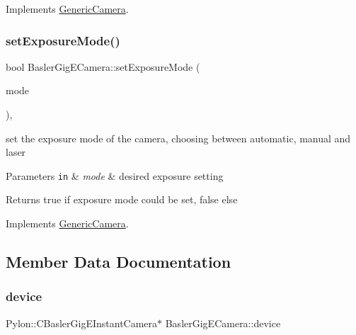 Implements \hyperlink{class_generic_camera_a62365678e9254bde587de4a50ffb7887}{Generic\+Camera}.

\mbox{\label{class_basler_gig_e_camera_a228061fb068600be59b4e83c0e8a8e50}} 
\subsubsection{\texorpdfstring{set\+Exposure\+Mode()}{setExposureMode()}}
{\footnotesize\ttfamily bool Basler\+Gig\+E\+Camera\+::set\+Exposure\+Mode (\begin{DoxyParamCaption}\item[{\hyperlink{constants_8h_a6e920987695b1da6e2df4e41dc867e18}{Exposure\+Modes}}]{mode }\end{DoxyParamCaption})\hspace{0.3cm}{\ttfamily [override]}, {\ttfamily [virtual]}}

set the exposure mode of the camera, choosing between automatic, manual and laser 
\begin{DoxyParams}[1]{Parameters}
\mbox{\tt in}  & {\em mode} & desired exposure setting \\
\hline
\end{DoxyParams}
\begin{DoxyReturn}{Returns}
true if exposure mode could be set, false else 
\end{DoxyReturn}


Implements \hyperlink{class_generic_camera_a5c3bd3ca0d691cf9026f8c91b3cf7c66}{Generic\+Camera}.



\subsection{Member Data Documentation}
\mbox{\label{class_basler_gig_e_camera_a1168e69fb72a76385e2628e6dfc3472c}} 
\subsubsection{\texorpdfstring{device}{device}}
{\footnotesize\ttfamily Pylon\+::\+C\+Basler\+Gig\+E\+Instant\+Camera$\ast$ Basler\+Gig\+E\+Camera\+::device\hspace{0.3cm}{\ttfamily [private]}}

